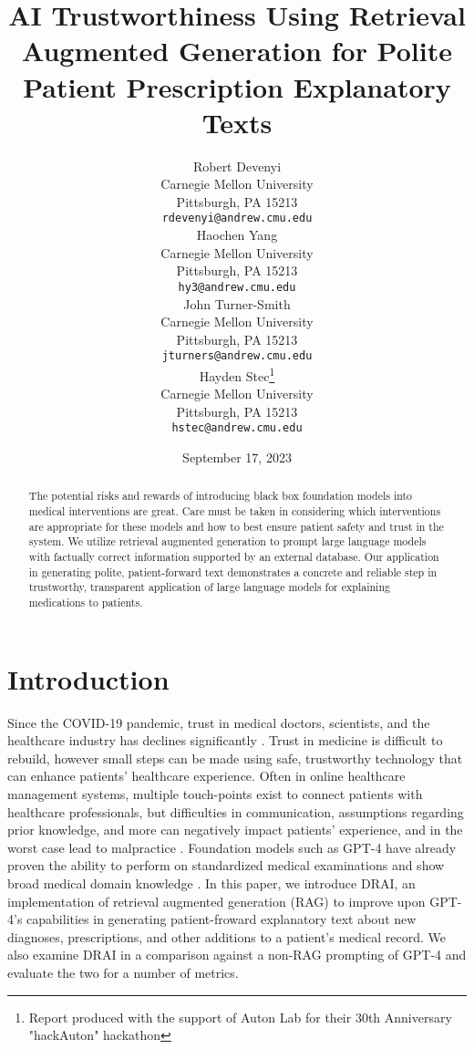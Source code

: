 \documentclass{article}
\title{AI Trustworthiness Using Retrieval Augmented Generation for Polite Patient Prescription Explanatory Texts}
\date{September 17, 2023}	%
\author{{Robert Devenyi}\\
	Carnegie Mellon University\\
	Pittsburgh, PA 15213 \\
	\texttt{rdevenyi@andrew.cmu.edu} \\
        \And
        {Haochen Yang} \\
	Carnegie Mellon University\\
	Pittsburgh, PA 15213\\
	\texttt{hy3@andrew.cmu.edu} \\
 	\And
	{John Turner-Smith} \\
	Carnegie Mellon University\\
	Pittsburgh, PA 15213\\
	\texttt{jturners@andrew.cmu.edu} \\
        \And
        {Hayden Stec\thanks{Report produced with the support of Auton Lab for their 30th Anniversary "hackAuton" hackathon}} \\
	Carnegie Mellon University\\
	Pittsburgh, PA 15213\\
	\texttt{hstec@andrew.cmu.edu} \\
}
\begin{document}
\maketitle

\begin{abstract}
The potential risks and rewards of introducing black box foundation models into medical interventions are great. Care must be taken in considering which interventions are appropriate for these models and how to best ensure patient safety and trust in the system. We utilize retrieval augmented generation to prompt large language models with factually correct information supported by an external database. Our application in generating polite, patient-forward text demonstrates a concrete and reliable step in trustworthy, transparent application of large language models for explaining medications to patients.
\end{abstract}




\section{Introduction}
Since the COVID-19 pandemic, trust in medical doctors, scientists, and the healthcare industry has declines significantly \citep{pew2022trust}. Trust in medicine is difficult to rebuild, however small steps can be made using safe, trustworthy technology that can enhance patients' healthcare experience. Often in online healthcare management systems, multiple touch-points exist to connect patients with healthcare professionals, but difficulties in communication, assumptions regarding prior knowledge, and more can negatively impact patients' experience, and in the worst case lead to malpractice \citep{humphrey2022malpractice}. Foundation models such as GPT-4 have already proven the ability to perform on standardized medical examinations and show broad medical domain knowledge \citealp{openai2023gpt4}. In this paper, we introduce DRAI, an implementation of retrieval augmented generation (RAG) to improve upon GPT-4's capabilities in generating patient-froward explanatory text about new diagnoses, prescriptions, and other additions to a patient's medical record. We also examine DRAI in a comparison against a non-RAG prompting of GPT-4 and evaluate the two for a number of metrics.
\end{document}
